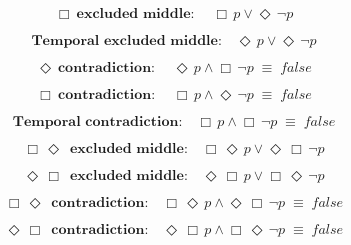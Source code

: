 \documentclass[12pt, fleqn, leqno]{article}
\newcommand{\equivs}{\ensuremath{\;\equiv\;}}       %
\newcommand{\Event}{\Diamond\,}
\newcommand{\Always}{\Box\,}
\newcommand{\spacer}{\vspace{-30pt}}
\begin{document}
\begin{equation}\label{E:excludedMidb}
\textbf{$\Always$ excluded middle:}\quad \Always p \lor \Event\neg p
\end{equation}

\spacer

\begin{equation}\label{E:excludedMidc}
\textbf{Temporal excluded middle:}\quad \Event p \lor \Event\neg p
\end{equation}

\spacer

\begin{equation}\label{E:contradiction}
\textbf{$\Event$ contradiction:}\quad \Event p \land \Always\neg p \equivs false
\end{equation}

\spacer

\begin{equation}\label{E:contradictionb}
\textbf{$\Always$ contradiction:}\quad \Always p \land \Event\neg p \equivs false
\end{equation}

\spacer

\begin{equation}\label{E:contradictionc}
\textbf{Temporal contradiction:}\quad \Always p \land \Always \neg p \equivs false
\end{equation}

\spacer

\begin{equation}\label{E:AEexcludedMid}
\textbf{$\Always \Event $ excluded middle:}\quad \Always \Event p \lor \Event \Always\neg p
\end{equation}

\spacer

\begin{equation}\label{E:EAexcludedMid}
\textbf{$\Event \Always $ excluded middle:}\quad \Event \Always p \lor \Always \Event\neg p
\end{equation}

\spacer

\begin{equation}\label{E:AEcontradiction}
\textbf{$\Always \Event$ contradiction:}\quad \Always \Event p \land \Event \Always\neg p \equivs false
\end{equation}

\spacer

\begin{equation}\label{E:EAcontradiction}
\textbf{$\Event \Always$ contradiction:}\quad \Event \Always p \land  \Always \Event\neg p \equivs false
\end{equation}
\end{document}
